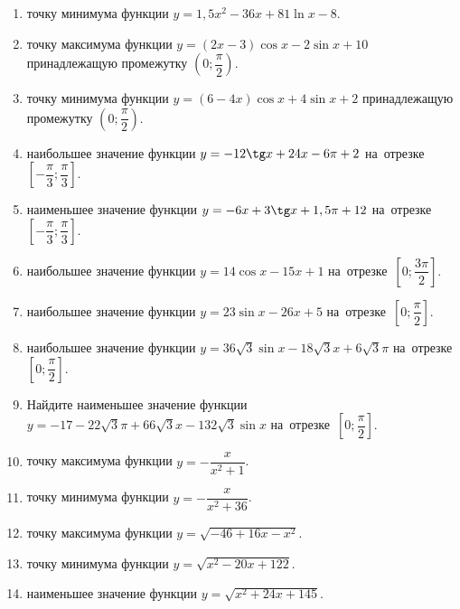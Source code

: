 \documentclass[a4paper,10pt]{article}
\begin{document}
\begin{enumerate}
\item {} точку минимума функции $y=1,5x^2-36x+81\ln x -8$.

\item {} точку максимума функции $y=\left(2x-3\right)\cos x -2\sin x+10$
принадлежащую промежутку $\left(0;\dfrac{\pi}{2}\right)$.

\item {} точку минимума функции $y=\left(6-4x\right)\cos x +4\sin x+2$
принадлежащую промежутку $\left(0;\dfrac{\pi}{2}\right)$.

\item {} наибольшее значение функции $y=-12\tg x +24x-6\pi +2$ на~отрезке~$\left[-\dfrac{\pi}{3};\dfrac{\pi}{3}\right]$.

\item {} наименьшее значение функции $y=-6x +3\tg x+1,5\pi+12$ на~отрезке~$\left[-\dfrac{\pi}{3};\dfrac{\pi}{3}\right]$.

\item {} наибольшее значение функции $y=14\cos x-15x+1$ на~отрезке~$\left[0;\dfrac{3\pi}{2}\right]$.

\item {} наибольшее значение функции $y=23\sin x-26x+5$ на~отрезке~$\left[0;\dfrac{\pi}{2}\right]$.

\item {} наибольшее значение функции $y=36\sqrt{3}\sin x-18\sqrt{3}x+6\sqrt{3}\pi $ на~отрезке~$\left[0;\dfrac{\pi}{2}\right]$.

\item Найдите наименьшее значение функции $y=-17-22\sqrt{3}\pi+66\sqrt{3}x-132\sqrt{3}\sin x$ на~отрезке~$\left[0;\dfrac{\pi}{2}\right]$.

\item {} точку максимума функции $y=-\dfrac{x}{ x^2 +1}$.

\item {} точку минимума функции $y=-\dfrac{x}{ x^2 +36}$.

\item {} точку максимума функции $y=\sqrt{-46+16x-x^2}$.

\item {} точку минимума функции $y=\sqrt{x^2-20x+122}$.

\item {} наименьшее значение функции $y=\sqrt{x^2+24x+145}$.


\end{enumerate}
\end{document}
